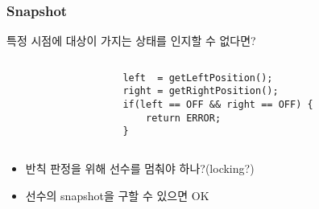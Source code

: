 \begin{frame}[fragile]
\frametitle{Snapshot}

특정 시점에 대상이 가지는 상태를 인지할 수 없다면?

\begin{columns}[t]
  \begin{column}{.5\textwidth}
\\
  \end{column}
  \begin{column}{.5\textwidth}
  \lstset{language=Java,basicstyle=\ttfamily\small}
  \begin{lstlisting}
left  = getLeftPosition();
right = getRightPosition();
if(left == OFF && right == OFF) {
    return ERROR;
}
  \end{lstlisting}
  \end{column}
\end{columns}

\begin{itemize}
\item 반칙 판정을 위해 선수를 멈춰야 하나?(locking?)
\item 선수의 snapshot을 구할 수 있으면 OK
\end{itemize}

\end{frame}


